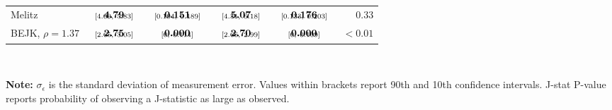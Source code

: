 \documentclass[12pt,dvips, ps2pdf]{article}
\begin{document}
\begin{table}[!t]
\begin{center}
\begin{tabular}[t]{l c c c c c}
Melitz                    & $\begin{array}{c}{\textbf{4.79}} \vspace{-.4cm}\\ \scriptstyle{[4.09,   \ 5.83]}\end{array}$& $\begin{array}{c}{\textbf{0.151}} \vspace{-.4cm}\\ \scriptstyle{[0.104,   \ 0.189]}\end{array}$ &  $\begin{array}{c}{\textbf{5.07}} \vspace{-.4cm}\\ \scriptstyle{[4.31,   \ 6.18]}\end{array}$& $\begin{array}{c}{\textbf{0.176}} \vspace{-.4cm}\\ \scriptstyle{[0.133,   \ 0.203]}\end{array}$ & $\phantom{<} 0.33$   \\
BEJK, $\rho = 1.37$         & $\begin{array}{c}{\textbf{2.75}} \vspace{-.4cm}\\ \scriptstyle{[2.65,   \ 3.05]}\end{array}$ & $\begin{array}{c}{\textbf{0.000}} \vspace{-.4cm}\\ \scriptstyle{[0,   \ 0.114]}\end{array}$  & $\begin{array}{c}{\textbf{2.70}} \vspace{-.4cm}\\ \scriptstyle{[2.66,   \ 2.99]}\end{array}$ & $\begin{array}{c}{\textbf{0.000}} \vspace{-.4cm}\\ \scriptstyle{[0,   \ 0.109]}\end{array}$ &  $< 0.01$          \\
\hline
\end{tabular}
\\[0.75ex]
\parbox{6.15in}{\footnotesize \textbf{Note:} $\sigma_{\epsilon}$ is the standard deviation of measurement error. Values within brackets report 90th and 10th confidence intervals. J-stat P-value reports probability of observing a J-statistic as large as observed.}
\end{center}
\end{table}
\end{document}
